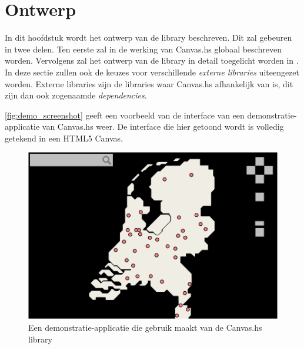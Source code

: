 \chapter{Ontwerp} \label{hoofdstuk:ontwerp}
In dit hoofdstuk wordt het ontwerp van de library beschreven. Dit zal gebeuren in twee delen. Ten eerste zal in  de werking van Canvas.hs globaal beschreven worden. 
Vervolgens zal het ontwerp van de library in detail toegelicht worden in . In deze sectie zullen ook de keuzes voor verschillende \emph{externe libraries} uiteengezet worden. Externe libraries zijn de libraries waar Canvas.hs afhankelijk van is, dit zijn dan ook zogenaamde \emph{dependencies}. 

 \autoref{fig:demo_screenshot} geeft een voorbeeld van de interface van een demonstratie-applicatie van Canvas.hs weer. De interface die hier getoond wordt is volledig getekend in een HTML5 Canvas.

\begin{figure}[H]
\begin{center}
\includegraphics[keepaspectratio,width=\textwidth]{./images/demo.png}
\caption{Een demonstratie-applicatie die gebruik maakt van de Canvas.hs library}
\label{fig:demo_screenshot}
\end{center}
\end{figure}


